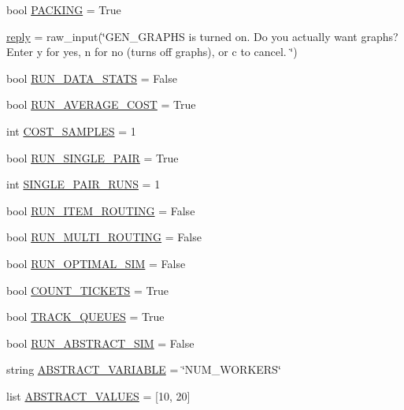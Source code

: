 \begin{DoxyCompactItemize}
\item 
bool \hyperlink{namespacereorder_a23735ccf05ebd9212e9ebaab8f652507}{P\+A\+C\+K\+I\+NG} = True
\item 
\hyperlink{namespacereorder_a496267841b3ab9e872499fd2731736ff}{reply} = raw\+\_\+input(\char`\"{}G\+E\+N\+\_\+\+G\+R\+A\+P\+HS is turned on. Do you actually want graphs? Enter y for yes, n for no (turns off graphs), or c to cancel. \char`\"{})
\item 
bool \hyperlink{namespacereorder_a36bc09bc8fbde0df2ea1c5d9ed0cf135}{R\+U\+N\+\_\+\+D\+A\+T\+A\+\_\+\+S\+T\+A\+TS} = False
\item 
bool \hyperlink{namespacereorder_a21f2f0f4c6df7faefb843dd318af3452}{R\+U\+N\+\_\+\+A\+V\+E\+R\+A\+G\+E\+\_\+\+C\+O\+ST} = True
\item 
int \hyperlink{namespacereorder_a134ac33ad7706cd6a24fda5b63c73c65}{C\+O\+S\+T\+\_\+\+S\+A\+M\+P\+L\+ES} = 1
\item 
bool \hyperlink{namespacereorder_ab61137c2de5f99b09789a6e76b7cda4c}{R\+U\+N\+\_\+\+S\+I\+N\+G\+L\+E\+\_\+\+P\+A\+IR} = True
\item 
int \hyperlink{namespacereorder_a70d4dc65db288020e23ca213cd97c0f8}{S\+I\+N\+G\+L\+E\+\_\+\+P\+A\+I\+R\+\_\+\+R\+U\+NS} = 1
\item 
bool \hyperlink{namespacereorder_a41d76408f27c5889dc3f40f066583a9f}{R\+U\+N\+\_\+\+I\+T\+E\+M\+\_\+\+R\+O\+U\+T\+I\+NG} = False
\item 
bool \hyperlink{namespacereorder_a5f084acb116f3a65b90532f6a2ecb81b}{R\+U\+N\+\_\+\+M\+U\+L\+T\+I\+\_\+\+R\+O\+U\+T\+I\+NG} = False
\item 
bool \hyperlink{namespacereorder_a82ca5524da03a0787588ac48df06bb1a}{R\+U\+N\+\_\+\+O\+P\+T\+I\+M\+A\+L\+\_\+\+S\+IM} = False
\item 
bool \hyperlink{namespacereorder_ac35fabae4c109189ac40e759f367ee79}{C\+O\+U\+N\+T\+\_\+\+T\+I\+C\+K\+E\+TS} = True
\item 
bool \hyperlink{namespacereorder_a170d7dba5203e9b2ab89eb541ed83b3a}{T\+R\+A\+C\+K\+\_\+\+Q\+U\+E\+U\+ES} = True
\item 
bool \hyperlink{namespacereorder_a73b7b22a82dc40407d03e22dca8ac257}{R\+U\+N\+\_\+\+A\+B\+S\+T\+R\+A\+C\+T\+\_\+\+S\+IM} = False
\item 
string \hyperlink{namespacereorder_a05ba5c39ee5a05284597d091b01650a3}{A\+B\+S\+T\+R\+A\+C\+T\+\_\+\+V\+A\+R\+I\+A\+B\+LE} = \char`\"{}N\+U\+M\+\_\+\+W\+O\+R\+K\+E\+RS\char`\"{}
\item 
list \hyperlink{namespacereorder_ab64c8432c11e4b89425ac1f220ca01a9}{A\+B\+S\+T\+R\+A\+C\+T\+\_\+\+V\+A\+L\+U\+ES} = \mbox{[}10, 20\mbox{]}

\end{DoxyCompactItemize}
